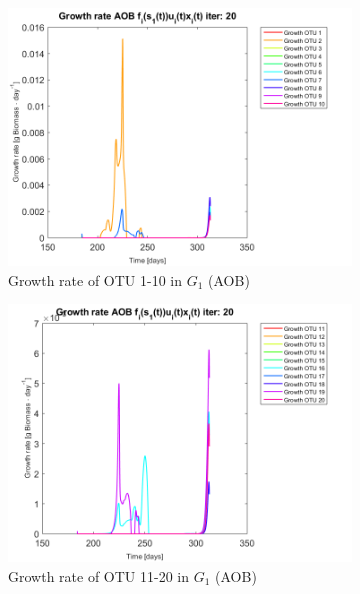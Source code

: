 \documentclass[processes,article,submit,moreauthors,pdftex]{Definitions/mdpi}
\begin{document}
\begin{figure}[h]
	\centering
	\begin{subfigure}{0.45 \textwidth}
		\includegraphics[width =\textwidth]{Application//200407_iter_20_growth_control_AOB_plot_1}
		\caption{Growth rate of OTU 1-10 in $G_1$ (AOB) }
	\end{subfigure}
	\begin{subfigure}{0.45 \textwidth}
		\includegraphics[width =\textwidth]{Application//200407_iter_20_growth_control_AOB_plot_2}
		\caption{Growth rate of OTU 11-20 in $G_1$ (AOB) }
	\end{subfigure}
	\begin{subfigure}{0.45 \textwidth}

\end{subfigure}
\end{figure}
\end{document}
